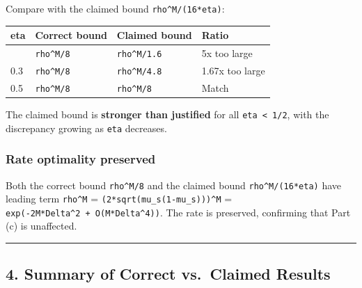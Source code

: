 \documentclass[
  12pt,
]{ctexart}
\begin{document}
Compare with the claimed bound \texttt{rho\^{}M/(16*eta)}:

\begin{longtable}[]{@{}llll@{}}
\toprule\noalign{}
eta & Correct bound & Claimed bound & Ratio \\
\midrule\noalign{}
\endhead
\bottomrule\noalign{}
\endlastfoot
0.1 & \texttt{rho\^{}M/8} & \texttt{rho\^{}M/1.6} & 5x too large \\
0.3 & \texttt{rho\^{}M/8} & \texttt{rho\^{}M/4.8} & 1.67x too large \\
0.5 & \texttt{rho\^{}M/8} & \texttt{rho\^{}M/8} & Match \\
\end{longtable}

The claimed bound is \textbf{stronger than justified} for all
\texttt{eta\ \textless{}\ 1/2}, with the discrepancy growing as
\texttt{eta} decreases.

\subsubsection{Rate optimality
preserved}\label{rate-optimality-preserved}

Both the correct bound \texttt{rho\^{}M/8} and the claimed bound
\texttt{rho\^{}M/(16*eta)} have leading term \texttt{rho\^{}M} =
\texttt{(2*sqrt(mu\_s(1-mu\_s)))\^{}M} =
\texttt{exp(-2M*Delta\^{}2\ +\ O(M*Delta\^{}4))}. The rate is preserved,
confirming that Part (c) is unaffected.

\begin{center}\rule{0.5\linewidth}{0.5pt}\end{center}

\subsection{4. Summary of Correct vs.~Claimed
Results}\label{summary-of-correct-vs.-claimed-results}
\end{document}
